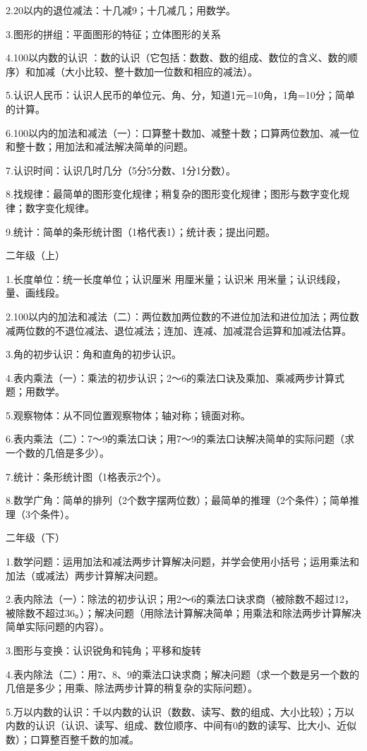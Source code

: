 2.20以内的退位减法：十几减9；十几减几；用数学。

3.图形的拼组：平面图形的特征；立体图形的关系

4.100以内数的认识 ：数的认识（它包括：数数、数的组成、数位的含义、数的顺序）和加减（大小比较、整十数加一位数和相应的减法）。

5.认识人民币：认识人民币的单位元、角、分，知道1元=10角，1角=10分；简单的计算。

6.100以内的加法和减法（一）：口算整十数加、减整十数；口算两位数加、减一位和整十数；用加法和减法解决简单的问题。

7.认识时间：认识几时几分（5分5分数、1分1分数）。

8.找规律：最简单的图形变化规律；稍复杂的图形变化规律；图形与数字变化规律；数字变化规律。

9.统计：简单的条形统计图（1格代表1）；统计表；提出问题。

二年级（上）

1.长度单位：统一长度单位；认识厘米 用厘米量；认识米 用米量；认识线段，量、画线段。

2.100以内的加法和减法（二）：两位数加两位数的不进位加法和进位加法；两位数减两位数的不退位减法、退位减法；连加、连减、加减混合运算和加减法估算。

3.角的初步认识：角和直角的初步认识。

4.表内乘法（一）：乘法的初步认识；2～6的乘法口诀及乘加、乘减两步计算式题；用数学。

5.观察物体：从不同位置观察物体；轴对称；镜面对称。

6.表内乘法（二）：7～9的乘法口诀；用7～9的乘法口诀解决简单的实际问题（求一个数的几倍是多少）。

7.统计：条形统计图（1格表示2个）。

8.数学广角：简单的排列（2个数字摆两位数）；最简单的推理（2个条件）；简单推理（3个条件）。

二年级（下）

1.数学问题：运用加法和减法两步计算解决问题，并学会使用小括号；运用乘法和加法（或减法）两步计算解决问题。

2.表内除法（一）：除法的初步认识；用2～6的乘法口诀求商（被除数不超过12，被除数不超过36。）；解决问题（用除法计算解决简单；用乘法和除法两步计算解决简单实际问题的内容）。

3.图形与变换：认识锐角和钝角；平移和旋转

4.表内除法（二）：用7、8、9的乘法口诀求商；解决问题（求一个数是另一个数的几倍是多少；用乘、除法两步计算的稍复杂的实际问题）。

5.万以内数的认识：千以内数的认识（数数、读写、数的组成、大小比较）；万以内数的认识（认识、读写、组成、数位顺序、中间有0的数的读写、比大小、近似数）；口算整百整千数的加减。

